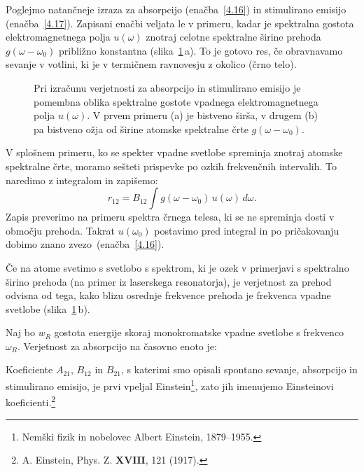 Poglejmo natančneje izraza za absorpcijo
(enačba~\ref{4.16}) in stimulirano emisijo (enačba~\ref{4.17}).
Zapisani enačbi veljata le v primeru, 
kadar je spektralna gostota 
elektromagnetnega polja $u(\omega)$
znotraj celotne spektralne širine prehoda $g(\omega - \omega_0)$ približno konstantna 
(slika~\ref{fig:spektri}\,a). To je gotovo res, če
obravnavamo sevanje v votlini, ki je v termičnem ravnovesju z okolico (črno telo).

\begin{figure}[ht]
\centering
\def\svgwidth{128truemm} 

\caption{Pri izračunu verjetnosti za absorpcijo in stimulirano emisijo je 
pomembna oblika spektralne gostote vpadnega elektromagnetnega polja $u(\omega)$. V prvem primeru (a) je 
bistveno širša, v drugem (b) pa bistveno ožja od širine atomske spektralne črte $g(\omega-\omega_0)$.}
\label{fig:spektri}
\end{figure}

V splošnem primeru, ko se spekter vpadne svetlobe spreminja znotraj 
atomske spektralne črte, moramo sešteti prispevke po ozkih frekvenčnih intervalih. 
To naredimo z integralom in zapišemo:
\begin{equation}
r_{12}=B_{12}\int g(\omega-\omega_0)\, u(\omega)\, d\omega.
\label{4.19}
\end{equation}
Zapis preverimo na primeru spektra črnega telesa, ki se ne spreminja 
dosti v območju prehoda. Takrat $u(\omega_0)$ postavimo pred integral in po pričakovanju
dobimo znano zvezo~(enačba~\ref{4.16}). 

Če na atome svetimo s svetlobo s spektrom, ki je ozek v primerjavi s spektralno 
širino prehoda (na primer iz laserskega resonatorja), je verjetnost za prehod 
odvisna od tega, kako blizu osrednje frekvence prehoda je frekvenca vpadne 
svetlobe (slika~\ref{fig:spektri}\,b). 

Naj bo  $w_{R}$ gostota energije skoraj
monokromatske vpadne svetlobe s frekvenco $\omega_R$. Verjetnost za absorpcijo na časovno 
enoto je:

Koeficiente $A_{21}$, $B_{12}$ in $B_{21}$, s katerimi smo opisali spontano sevanje,
absorpcijo in stimulirano emisijo, je prvi vpeljal Einstein\footnote{Nemški fizik
in nobelovec Albert Einstein, 1879--1955.}, zato jih imenujemo 
Einsteinovi koeficienti.\footnote{A. Einstein,
Phys. Z. $\mathbf{XVIII}$, 121 (1917).} 

